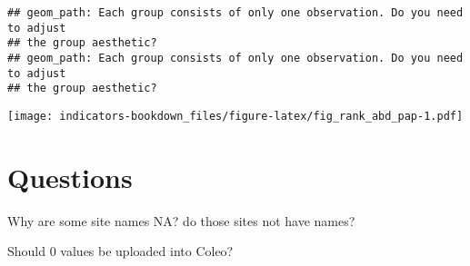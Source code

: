 \documentclass[
]{book}
\begin{document}
\begin{verbatim}
## geom_path: Each group consists of only one observation. Do you need to adjust
## the group aesthetic?
## geom_path: Each group consists of only one observation. Do you need to adjust
## the group aesthetic?
\end{verbatim}

\texttt{[image: indicators-bookdown\_files/figure-latex/fig\_rank\_abd\_pap-1.pdf]}

\hypertarget{questions-2}{%
\section{Questions}\label{questions-2}}

Why are some site names NA? do those sites not have names?

Should 0 values be uploaded into Coleo?

  
\end{document}
